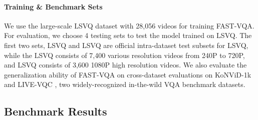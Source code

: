 \documentclass[runningheads]{llncs}
\begin{document}
\vspace{-25pt}
\begin{table}[]
    \centering
\setlength\tabcolsep{5pt}
    \caption{Comparison of FAST-VQA and FAST-VQA-M with lower sampling density.}
    \label{tab:impdetail}
    \vspace{-14pt}
\end{table}

\paragraph{Training \& Benchmark Sets} We use the large-scale LSVQ{}\cite{pvq} dataset with 28,056 videos for training FAST-VQA. For evaluation, we choose 4 testing sets to test the model trained on LSVQ. The first two sets, LSVQ and LSVQ are official intra-dataset test subsets for LSVQ, while the LSVQ consists of 7,400 various resolution videos from 240P to 720P, and LSVQ consists of 3,600 1080P high resolution videos. We also evaluate the generalization ability of FAST-VQA on cross-dataset evaluations on KoNViD-1k \cite{kv1k} and LIVE-VQC \cite{vqc}, two widely-recognized in-the-wild VQA benchmark datasets. 





\subsection{Benchmark Results}
\end{document}
